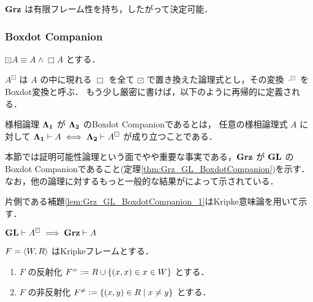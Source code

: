 \documentclass{jlreq}
\begin{document}
\begin{corollary}
	$\mathbf{Grz}$ は有限フレーム性を持ち，したがって決定可能．
\end{corollary}

\subsubsection{Boxdot Companion}

\begin{definition}
	$\boxdot A \equiv A \land \Box A$ とする．
\end{definition}

\begin{definition}[Boxdot変換]
	$A^\boxdot$ は $A$ の中に現れる $\Box$ を全て $\boxdot$ で置き換えた論理式とし，その変換 $\cdot^\boxdot$ をBoxdot変換と呼ぶ．
	もう少し厳密に書けば，以下のように再帰的に定義される．
\end{definition}

\begin{definition}
	様相論理 $\mathbf{\Lambda_1}$ が $\mathbf{\Lambda_2}$ のBoxdot Companionであるとは，
	任意の様相論理式 $A$ に対して $\mathbf{\Lambda_1} \vdash A \iff \mathbf{\Lambda_2} \vdash A^\boxdot$ が成り立つことである．
\end{definition}

本節では証明可能性論理という面でやや重要な事実である，$\mathbf{Grz}$ が $\mathbf{GL}$ のBoxdot Companionであること(定理\ref{thm:Grz_GL_BoxdotCompanion})を示す．
なお，他の論理に対するもっと一般的な結果が\cite*{jerabek_cluster_2016}によって示されている．

片側である補題\ref{lem:Grz_GL_BoxdotCompanion_1}はKripke意味論を用いて示す．

\begin{lemma}\label{lem:Grz_GL_BoxdotCompanion_1}
	$\mathbf{GL} \vdash A^\boxdot \implies \mathbf{Grz} \vdash A$
\end{lemma}

\begin{definition}
	$F = \langle W, R \rangle$ はKripkeフレームとする．
	\begin{enumerate}
		\item $F$ の反射化 $F^{=} := R \cup \{ (x, x) \in x \in W\}$ とする．
		\item $F$ の非反射化 $F^{\neq} := \{(x,y) \in R \mid x \neq y \}$ とする．
	\end{enumerate}
\end{definition}
\end{document}

